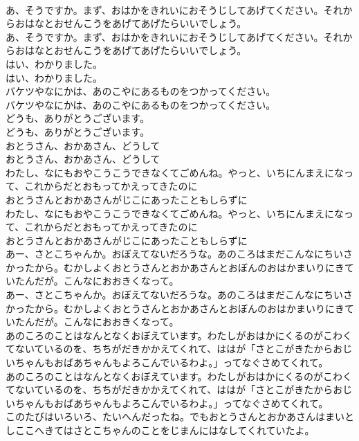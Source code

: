 \documentclass[8pt]{extreport}
\begin{document}
\begin{CJK}{UTF8}{min}
\\	あ、そうですか。まず、おはかをきれいにおそうじしてあげてください。それからおはなとおせんこうをあげてあげたらいいでしょう。
\\	あ、そうですか。まず、おはかをきれいにおそうじしてあげてください。それからおはなとおせんこうをあげてあげたらいいでしょう。
\\	はい、わかりました。
\\	はい、わかりました。
\\	バケツやなにかは、あのこやにあるものをつかってください。
\\	バケツやなにかは、あのこやにあるものをつかってください。
\\	どうも、ありがとうございます。
\\	どうも、ありがとうございます。
\\	おとうさん、おかあさん、どうして
\\	おとうさん、おかあさん、どうして
\\	わたし、なにもおやこうこうできなくてごめんね。やっと、いちにんまえになって、これからだとおもってかえってきたのに
\\	おとうさんとおかあさんがじこにあったこともしらずに
\\	わたし、なにもおやこうこうできなくてごめんね。やっと、いちにんまえになって、これからだとおもってかえってきたのに
\\	おとうさんとおかあさんがじこにあったこともしらずに
\\	あー、さとこちゃんか。おぼえてないだろうな。あのころはまだこんなにちいさかったから。むかしよくおとうさんとおかあさんとおぼんのおはかまいりにきていたんだが。こんなにおおきくなって。
\\	あー、さとこちゃんか。おぼえてないだろうな。あのころはまだこんなにちいさかったから。むかしよくおとうさんとおかあさんとおぼんのおはかまいりにきていたんだが。こんなにおおきくなって。
\\	あのころのことはなんとなくおぼえています。わたしがおはかにくるのがこわくてないているのを、ちちがだきかかえてくれて、ははが「さとこがきたからおじいちゃんもおばあちゃんもよろこんでいるわよ。」ってなぐさめてくれて。
\\	あのころのことはなんとなくおぼえています。わたしがおはかにくるのがこわくてないているのを、ちちがだきかかえてくれて、ははが「さとこがきたからおじいちゃんもおばあちゃんもよろこんでいるわよ。」ってなぐさめてくれて。
\\	このたびはいろいろ、たいへんだったね。でもおとうさんとおかあさんはまいとしここへきてはさとこちゃんのことをじまんにはなしてくれていたよ。

\end{CJK}
\end{document}
